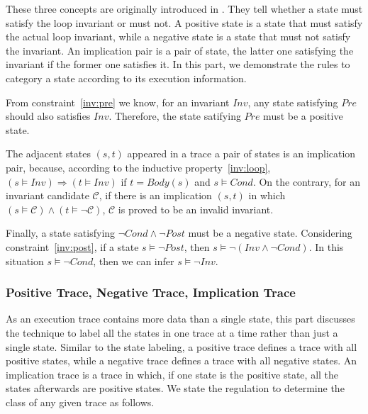 These three concepts are originally introduced in \cite{sharma2014invariant}.
They tell whether a state must satisfy the loop invariant or must not.
A positive state is a state that must satisfy the actual loop invariant,
while a negative state is a state that must not satisfy the invariant.
An implication pair is a pair of state, the latter one satisfying the invariant 
if the former one satisfies it. 
In this part, we demonstrate the rules to category a state according to its execution information.


From constraint~\ref{inv:pre} we know, for an invariant $Inv$, 
any state satisfying $Pre$ should also satisfies $Inv$. 
Therefore, the state satifying $Pre$ must be a positive state. 


The adjacent states $(s, t)$ appeared in a trace a pair of states is an implication pair,
because, according to the inductive property~\ref{inv:loop},
$(s \models Inv) \Rightarrow (t \models {Inv})$
if $t = Body(s)$ and $s \models Cond$.
On the contrary, for an invariant candidate $\mathcal{C}$, 
if there is an implication $(s, t)$ in which $(s \models \mathcal{C}) \wedge (t \models \neg \mathcal{C})$,
$\mathcal{C}$ is proved to be an invalid invariant.

Finally, a state satisfying $\neg{Cond} \wedge \neg{Post}$ must be a negative state.
Considering constraint~\ref{inv:post}, if a state $s \models \neg{Post}$,
then $s \models \neg(Inv \wedge \neg Cond)$.
In this situation $s \models \neg Cond$, then we can infer $s \models \neg Inv$. 



\subsubsection*{Positive Trace, Negative Trace, Implication Trace}
As an execution trace contains more data than a single state,
this part discusses the technique to label all the states in one trace at a time rather than just a single state.
Similar to the state labeling, a positive trace defines a trace with all positive states,
while a negative trace defines a trace with all negative states.
An implication trace is a trace in which, if one state is the positive state, 
all the states afterwards are positive states.
We state the regulation to determine the class of any given trace as follows.

